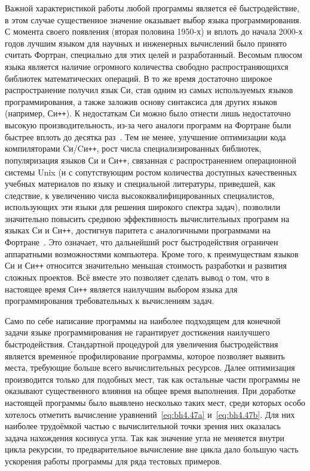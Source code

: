 Важной характеристикой работы любой программы является её
быстродействие, в этом случае существенное значение оказывает выбор
языка программирования.  С момента своего появления (вторая половина
1950-х) и вплоть до начала 2000-х годов лучшим языком для научных и
инженерных вычислений было принято считать Фортран, специально для
этих целей и разработанный. Весомым плюсом языка является наличие
огромного количества свободно распространяющихся библиотек
математических операций. В то же время достаточно широкое
распространение получил язык Си, став одним из самых используемых
языков программирования, а также заложив основу синтаксиса для других
языков (например, Си\texttt{++}).  К недостаткам Си можно было отнести
лишь недостаточно высокую производительность, из-за чего аналоги
программ на Фортране были быстрее вплоть до десятка
раз~\cite{Veldhuizen-1997}. Тем не менее, улучшение оптимизации кода
компиляторами Cи/Cи\texttt{++}, рост числа специализированных
библиотек, популяризация языков Си и Си\texttt{++}, связанная с
распространением операционной системы Unix (и с сопутствующим ростом
количества доступных качественных учебных материалов по языку и
специальной литературы, приведшей, как следствие, к увеличению числа
высококвалифицированных специалистов, использующих эти языки для
решения широкого спектра задач), позволили значительно повысить среднюю
эффективность вычислительных программ на языках Си и Си\texttt{++},
достигнув паритета с аналогичными программами на
Фортране~\cite{Veldhuizen-1997,Markovich-FDTD-2013}.  Это означает,
что дальнейший рост быстродействия ограничен аппаратными возможностями
компьютера.  Кроме того, к преимуществам языков Си и Си\texttt{++}
относится значительно меньшая стоимость разработки и развития сложных
проектов.  Всё вместе это позволяет сделать вывод о том, что в
настоящее время Си\texttt{++} является наилучшим выбором языка для
программирования требовательных к вычислениям задач.

Само по себе написание программы на наиболее подходящем для конечной
задачи языке программирования не гарантирует достижения наилучшего
быстродействия.  Стандартной процедурой для увеличения быстродействия
является временн\'ое профилирование программы, которое позволяет
выявить места, требующие больше всего вычислительных ресурсов.  Далее
оптимизация производится только для подобных мест, так как остальные
части программы не оказывают существенного влияния на общее время
выполнения.  При доработке настоящей программы было выявлено несколько
таких мест, среди которых особо хотелось отметить вычисление
уравнений~\ref{eq:bh4.47a} и~\ref{eq:bh4.47b}.  Для них наиболее
трудоёмкой частью с вычислительной точки зрения них оказалась задача
нахождения косинуса угла. Так как значение угла не меняется внутри
цикла рекурсии, то предварительное вычисление вне цикла дало большую
часть ускорения работы программы для ряда тестовых примеров.


